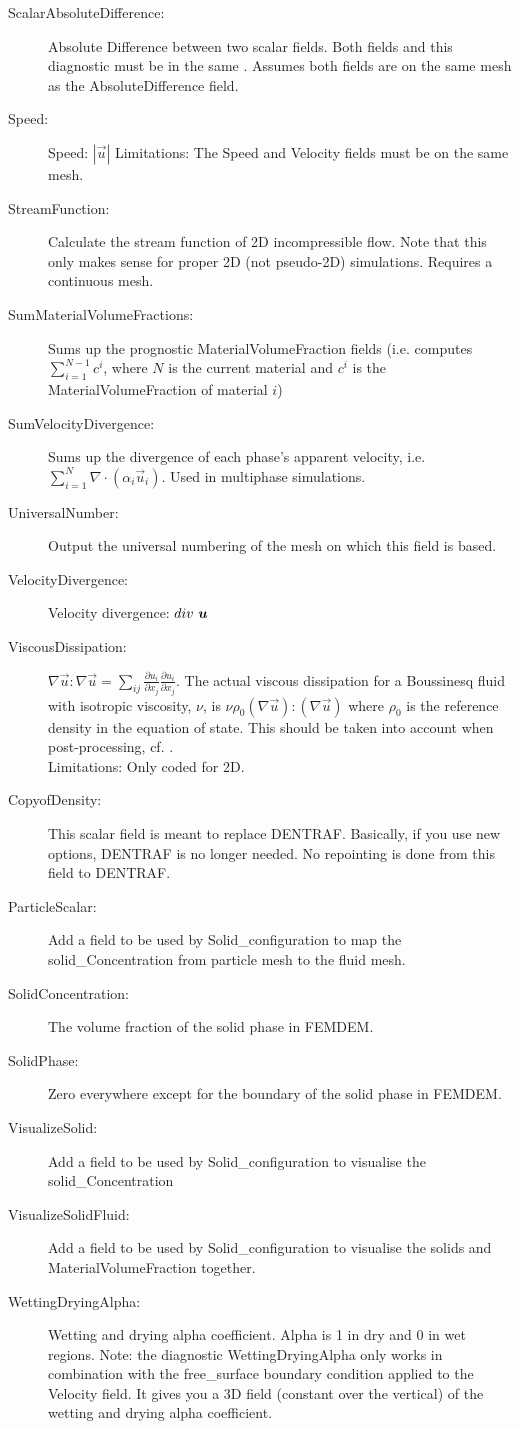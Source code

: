 \begin{description}
\item[ScalarAbsoluteDifference:]Absolute Difference between two scalar fields. Both fields and this diagnostic  must be in the same . Assumes both fields are on the same mesh as the AbsoluteDifference field.  
\item[Speed:]Speed: $|\vec{u}|$ 
	Limitations: The Speed and Velocity fields must be on the same mesh. 
\item[StreamFunction:]Calculate the stream function of 2D incompressible flow. Note that this only makes sense for proper 2D (not pseudo-2D) simulations. Requires a continuous mesh.
\item[SumMaterialVolumeFractions:]Sums up the prognostic MaterialVolumeFraction fields (i.e. computes $\sum_{i=1}^{N-1}c^i$, where $N$ is the current material and $c^i$ is the MaterialVolumeFraction of material $i$)
\item[SumVelocityDivergence:]Sums up the divergence of each phase's apparent velocity, i.e. $\sum_{i=1}^N{\nabla\cdot(\alpha_i\vec{u}_i)}$. Used in multiphase simulations. 
\item[UniversalNumber:]Output the universal numbering of the mesh on which this field is based.
\item[VelocityDivergence:]Velocity divergence: $div \mbox{ \vec{u}}$ 
\item[ViscousDissipation:] $\nabla \vec{u} : \nabla \vec{u} = \sum _{ij}\frac{\partial u_i}{\partial x_j}\frac{\partial u_i}{\partial x_j}$. The actual viscous dissipation for a Boussinesq fluid with isotropic viscosity, $\nu$, is $\nu \rho_0 (\nabla \vec{u}):(\nabla \vec{u})$ where $\rho_0$ is the reference density in the equation of state. This should be taken into account when post-processing, cf. \cite{winters1995}. \\
Limitations: Only coded for 2D.
\item[CopyofDensity:]This scalar field is meant to replace DENTRAF. Basically, if you use new options, DENTRAF is no longer needed. No repointing is done from this field to DENTRAF. 
\item[ParticleScalar:]Add a field to be used by Solid\_configuration to map the solid\_Concentration from particle mesh to the fluid mesh. 
\item[SolidConcentration:]The volume fraction of the solid phase in FEMDEM.
\item[SolidPhase:]Zero everywhere except for the boundary of the solid phase in FEMDEM.
\item[VisualizeSolid:]Add a field to be used by Solid\_configuration to visualise the solid\_Concentration 
\item[VisualizeSolidFluid:]Add a field to be used by Solid\_configuration to visualise the solids and MaterialVolumeFraction together.
\item[WettingDryingAlpha:]Wetting and drying alpha coefficient. Alpha is 1 in dry and 0 in wet regions. Note: the diagnostic WettingDryingAlpha only works in combination with the free\_surface boundary condition applied to the Velocity field. It gives you a 3D field (constant over the vertical) of the wetting and drying alpha coefficient.
\end{description}

